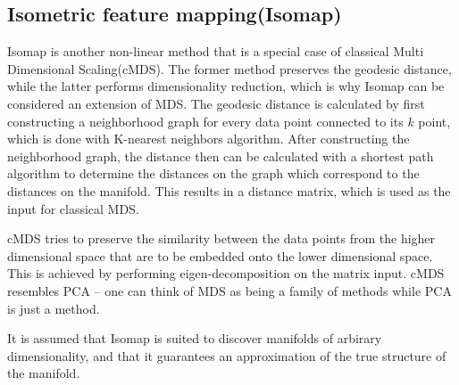 \begin{comment}
@misc{KPCA,
  url          = {https://arxiv.org/pdf/1207.3538.pdf},
  title        = {Kernel Principal Component Analysis and its Applications in Face Recognition and Active Shape Models},
  author       = {Quan Wang},
  urldate      = {2022-10-11}
}
\end{comment}

\subsection*{Isometric feature mapping(Isomap)}
Isomap is another non-linear method that is a special case of classical Multi Dimensional Scaling(cMDS). The former method preserves the geodesic distance, while the latter performs dimensionality reduction, which is why Isomap can be considered an extension of MDS. The geodesic distance is calculated by first constructing a neighborhood graph for every data point connected to its $k$ point, which is done with K-nearest neighbors algorithm. After constructing the neighborhood graph, the distance then can be calculated with a shortest path algorithm to determine the distances on the graph which correspond to the distances on the manifold. This results in a distance matrix, which is used as the input for classical MDS.\cite{MDS}


\begin{comment}
    @misc{MDS,
      url          = {https://arxiv.org/pdf/2009.08136.pdf},
      title        = {Multidimensional Scaling, Sammon Mapping, and Isomap:Tutorial and Survey},
      author       = {Benyamin Ghojogh, Ali Ghodsi, Fakhri Karray, Mark Crowley},
      urldate      = {2022-10-11}
    }
\end{comment}

cMDS tries to preserve the similarity between the data points from the higher dimensional space that are to be embedded onto the lower dimensional space. This is achieved by performing eigen-decomposition on the matrix input. cMDS resembles PCA -- one can think of MDS as being a family of methods while PCA is just a method.\cite{PCAMDS} \cite{MDS}


\begin{comment}
    @misc{PCAMDS,
      url          = {https://stats.stackexchange.com/questions/14002/whats-the-difference-between-principal-component-analysis-and-multidimensional},
      title        = {What's the difference between principal component analysis and multidimensional scaling?},
      urldate      = {2022-10-11}
    }
\end{comment}

It is assumed that Isomap is suited to discover manifolds of arbirary dimensionality, and that it guarantees an approximation of the true structure of the manifold. \cite{Tennenbaum}